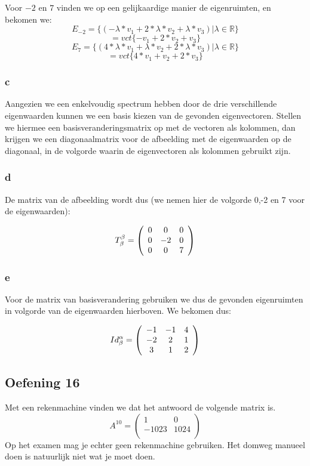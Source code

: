 \documentclass[lineaire_algebra_oplossingen.tex]{subfiles}
\begin{document}
Voor $-2$ en $7$ vinden we op een gelijkaardige manier de eigenruimten, en bekomen we:
\[E_{-2} = \{(-\lambda*v_1+2*\lambda*v_2+\lambda*v_3)|\lambda\in\mathbb{R}\}\]
\[=vct\{-v_1+2*v_2+v_3\}\]
\[E_{7} = \{(4*\lambda*v_1+\lambda*v_2+2*\lambda*v_3)|\lambda\in\mathbb{R}\}\]
\[=vct\{4*v_1+v_2+2*v_3\}\]

\subsubsection*{c}

Aangezien we een enkelvoudig spectrum hebben door de drie verschillende eigenwaarden kunnen we een basis kiezen van de gevonden eigenvectoren. Stellen we hiermee een basisveranderingsmatrix op met de vectoren als kolommen, dan krijgen we een diagonaalmatrix voor de afbeelding met de eigenwaarden op de diagonaal, in de volgorde waarin de eigenvectoren als kolommen gebruikt zijn.

\subsubsection*{d}

De matrix van de afbeelding wordt dus (we nemen hier de volgorde 0,-2 en 7 voor de eigenwaarden):

\[
T^\beta_\beta = \left(
\begin{array}{c c c}
0 & 0 & 0 \\
0 & -2 & 0 \\
0 & 0 & 7 \\
\end{array}
\right)
\]

\subsubsection*{e}

Voor de matrix van basisverandering gebruiken we dus de gevonden eigenruimten in volgorde van de eigenwaarden hierboven. We bekomen dus:

\[
Id^\alpha_\beta = \left(
\begin{array}{c c c}
-1 & -1 & 4 \\
-2 & 2 & 1 \\
3 & 1 & 2 \\
\end{array}
\right)
\]


\subsection{Oefening 16}
Met een rekenmachine vinden we dat het antwoord de volgende matrix is.
\[
A^{10}=
\begin{pmatrix}
1 & 0\\
-1023 & 1024\\
\end{pmatrix}
\]
Op het examen mag je echter geen rekenmachine gebruiken.
Het domweg manueel doen is natuurlijk niet wat je moet doen.
\end{document}
